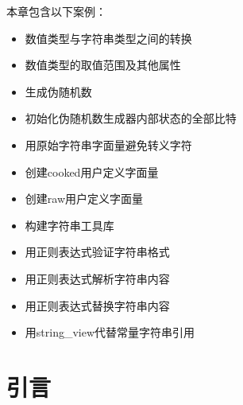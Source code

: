 
本章包含以下案例：



\begin{itemize}
\item 数值类型与字符串类型之间的转换



\item 数值类型的取值范围及其他属性



\item 生成伪随机数



\item 初始化伪随机数生成器内部状态的全部比特



\item 用原始字符串字面量避免转义字符



\item 创建cooked用户定义字面量



\item 创建raw用户定义字面量



\item 构建字符串工具库



\item 用正则表达式验证字符串格式



\item 用正则表达式解析字符串内容



\item 用正则表达式替换字符串内容



\item 用string\_view代替常量字符串引用

\end{itemize}



\section{引言}



